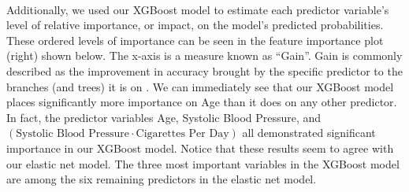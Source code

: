 \documentclass[10pt]{article}
\begin{document}
\

Additionally, we used our XGBoost model to estimate each predictor variable's level of relative importance, or impact, on the model's predicted probabilities. These ordered levels of importance can be seen in the feature importance plot (right) shown below. The x-axis is a measure known as “Gain”. Gain is commonly described as the improvement in accuracy brought by the specific predictor to the branches (and trees) it is on \cite{xgbImp}. We can immediately see that our XGBoost model places significantly more importance on Age than it does on any other predictor. In fact, the predictor variables Age, Systolic Blood Pressure, and $(\text{Systolic Blood Pressure} \cdot \text{Cigarettes Per Day})$ all demonstrated significant importance in our XGBoost model. Notice that these results seem to agree with our elastic net model. The three most important variables in the XGBoost model are among the six remaining predictors in the elastic net model. 

\begin{figure}[hbt!]
\hspace*{\fill}
\centering
{}\hspace{0em}
\hspace*{\fill}
\end{figure}
\end{document}
